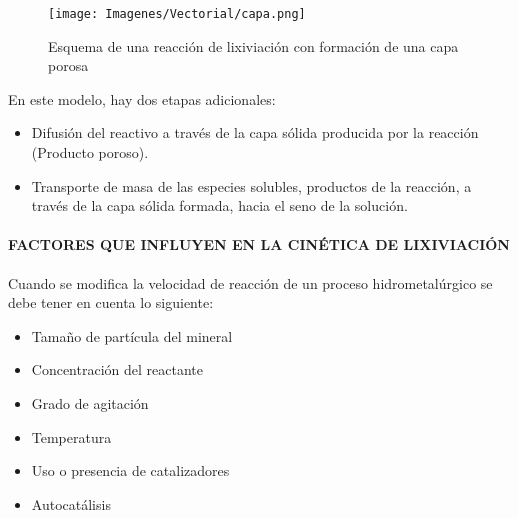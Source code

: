 \begin{figure}[H]
 \centering
 \texttt{[image: Imagenes/Vectorial/capa.png]}
 \caption{Esquema de una reacci\'on de lixiviaci\'on con formaci\'on de una capa porosa}
 \label{fig:h}
\end{figure}

En este modelo, hay dos etapas adicionales:
\begin{itemize}
 \item Difusi\'on del reactivo a trav\'es de la capa s\'olida producida por la reacci\'on
(Producto poroso).
\item Transporte de masa de las especies solubles, productos de la reacci\'on, a trav\'es de la capa s\'olida formada, hacia el seno de la soluci\'on.
\end{itemize}

\paragraph{FACTORES QUE INFLUYEN EN LA CIN\'ETICA DE LIXIVIACI\'ON}
Cuando se modifica	la velocidad de reacci\'on de un proceso	 hidrometal\'urgico se debe tener en cuenta lo siguiente:
\begin{itemize}
 \item Tama\~no de part\'icula del mineral
 \item Concentraci\'on del reactante
\item Grado de agitaci\'on
\item Temperatura
\item Uso o presencia de catalizadores
\item Autocat\'alisis
\end{itemize}

